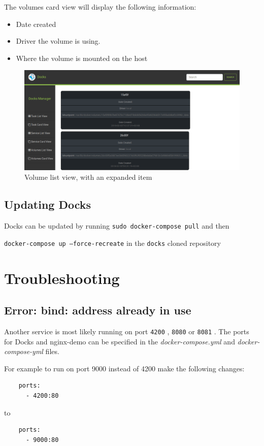 \documentclass[]{article}
\providecommand{\tightlist}{%
	\setlength{\itemsep}{0pt}\setlength{\parskip}{0pt}}
\let\oldtexttt\texttt
\renewcommand{\texttt}[1]{
	\colorbox{Light}{\oldtexttt{#1}}
}
\begin{document}
The volumes card view will display the following information:
\begin{itemize}
	\tightlist
	\item Date created
	\item Driver the volume is using.
	\item Where the volume is mounted on the host
\end{itemize}

\begin{figure}[H]
	\centering
	\includegraphics[scale=0.4]{volume_card_view.png}
	\caption{Volume list view, with an expanded item}
\end{figure}


\subsection{Updating Docks}
Docks can be updated by running \texttt{sudo docker-compose pull} and then
\texttt{docker-compose up --force-recreate} in the \texttt{docks} cloned repository


\section{Troubleshooting}
\subsection{Error: bind: address already in use}
Another service is most likely running on port \texttt{4200}, \texttt{8080} or \texttt{8081}.
The ports for Docks and nginx-demo can be specified in the \emph{docker-compose.yml} 
and \emph{docker-compose-yml} files.

For example to run on port 9000 instead of 4200 make the following changes:

\begin{lstlisting}
    ports:
      - 4200:80
\end{lstlisting}
to
\begin{lstlisting}
    ports:
      - 9000:80
\end{lstlisting}
\end{document}
